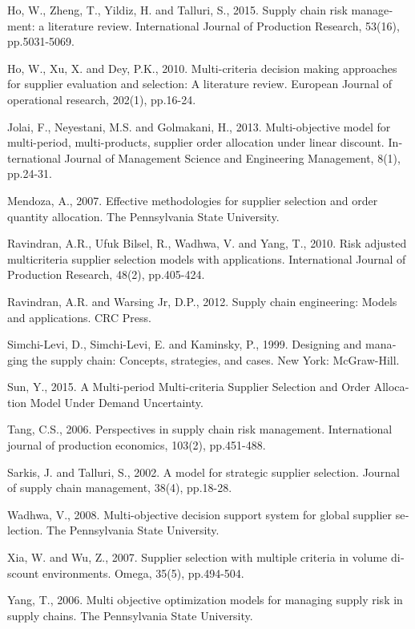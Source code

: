 \begin{thebibliography}{9}
\begin{latin}
		 Ho, W., Zheng, T., Yildiz, H. and Talluri, S., 2015. Supply chain risk management: a literature review. International Journal of Production Research, 53(16), pp.5031-5069.
	
			 Ho, W., Xu, X. and Dey, P.K., 2010. Multi-criteria decision making approaches for supplier evaluation and selection: A literature review. European Journal of operational research, 202(1), pp.16-24.
			
			 Jolai, F., Neyestani, M.S. and Golmakani, H., 2013. Multi-objective model for multi-period, multi-products, supplier order allocation under linear discount. International Journal of Management Science and Engineering Management, 8(1), pp.24-31.
		
		 Mendoza, A., 2007. Effective methodologies for supplier selection and order quantity allocation. The Pennsylvania State University.		
		
		
		 Ravindran, A.R., Ufuk Bilsel, R., Wadhwa, V. and Yang, T., 2010. Risk adjusted multicriteria supplier selection models with applications. International Journal of Production Research, 48(2), pp.405-424.
		
		 Ravindran, A.R. and Warsing Jr, D.P., 2012. Supply chain engineering: Models and applications. CRC Press.
						
		 Simchi-Levi, D., Simchi-Levi, E. and Kaminsky, P., 1999. Designing and managing the supply chain: Concepts, strategies, and cases. New York: McGraw-Hill.
	
	 Sun, Y., 2015. A Multi-period Multi-criteria Supplier Selection and Order Allocation Model Under Demand Uncertainty.	
	
	 Tang, C.S., 2006. Perspectives in supply chain risk management. International journal of production economics, 103(2), pp.451-488.
		
 Sarkis, J. and Talluri, S., 2002. A model for strategic supplier selection. Journal of supply chain management, 38(4), pp.18-28.		

		 Wadhwa, V., 2008. Multi-objective decision support system for global supplier selection. The Pennsylvania State University.

		Xia, W. and Wu, Z., 2007. Supplier selection with multiple criteria in volume discount environments. Omega, 35(5), pp.494-504.

	 Yang, T., 2006. Multi objective optimization models for managing supply risk in supply chains. The Pennsylvania State University.		
				

\end{latin}
\end{thebibliography}
